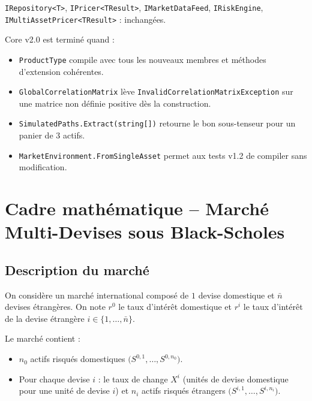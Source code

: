 \documentclass[a4paper,11pt]{article}
\newcommand{\cs}[1]{\texttt{\color{codeinline}#1}}
\begin{document}
\cs{IRepository<T>}, \cs{IPricer<TResult>}, \cs{IMarketDataFeed}, \cs{IRiskEngine},
\cs{IMultiAssetPricer<TResult>} : inchang\'ees.

\begin{tcolorbox}[deliverable]
Core v2.0 est termin\'e quand :
\begin{itemize}[leftmargin=1.5em]
  \item \cs{ProductType} compile avec tous les nouveaux membres et m\'ethodes d'extension coh\'erentes.
  \item \cs{GlobalCorrelationMatrix} l\`eve \cs{InvalidCorrelationMatrixException} sur une matrice
        non d\'efinie positive d\`es la construction.
  \item \cs{SimulatedPaths.Extract(string[])} retourne le bon sous-tenseur pour un panier de 3 actifs.
  \item \cs{MarketEnvironment.FromSingleAsset} permet aux tests v1.2 de compiler sans modification.
\end{itemize}
\end{tcolorbox}

\newpage
\section{Cadre math\'ematique -- March\'e Multi-Devises sous Black-Scholes}

\subsection{Description du march\'e}

On consid\`ere un march\'e international compos\'e de $1$ devise domestique et $\bar{n}$
devises \'etrang\`eres. On note $r^0$ le taux d'int\'er\^et domestique et $r^i$ le taux
d'int\'er\^et de la devise \'etrang\`ere $i \in \{1, \dots, \bar{n}\}$.

Le march\'e contient :
\begin{itemize}[leftmargin=1.5em]
  \item $n_0$ actifs risqu\'es domestiques $\bigl(S^{0,1}, \dots, S^{0,n_0}\bigr)$.
  \item Pour chaque devise $i$ : le taux de change $X^i$ (unit\'es de devise domestique
        pour une unit\'e de devise $i$) et $n_i$ actifs risqu\'es \'etrangers
        $\bigl(S^{i,1}, \dots, S^{i,n_i}\bigr)$.
\end{itemize}
\end{document}
